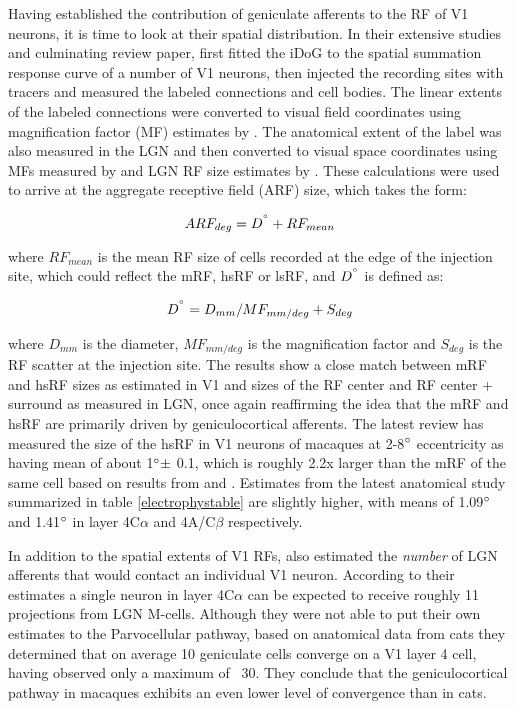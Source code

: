 Having established the contribution of geniculate afferents to the RF
of V1 neurons, it is time to look at their spatial distribution. In their
extensive studies and culminating review paper, \cite{Angelucci2006}
first fitted the iDoG to the spatial summation response curve of a
number of V1 neurons, then injected the recording sites with tracers and
measured the labeled connections and cell bodies. The linear
extents of the labeled connections were converted to visual field
coordinates using magnification factor (MF) estimates by
\cite{VanEssen1984}. The anatomical extent of the label was also
measured in the LGN and then converted to visual space coordinates using
MFs measured by \cite{Connolly1984} and LGN RF size estimates by
\cite{Derrington1984}. These calculations were used to arrive at the
aggregate receptive field (ARF) size, which takes the form:

\begin{equation}
  ARF_{deg} = D^{\degree} + RF_{mean}
\end{equation}

where $RF_{mean}$ is the mean RF size of cells recorded at the edge of
the injection site, which could reflect the mRF, hsRF or lsRF, and
$D^{\degree}$ is defined as:

\begin{equation}
  D^{\degree} = D_{mm} / MF_{mm/deg} + S_{deg}
\end{equation}

where $D_{mm}$ is the diameter, $MF_{mm/deg}$ is the magnification
factor and $S_{deg}$ is the RF scatter at the injection site. The
results show a close match between mRF and hsRF sizes as estimated in
V1 and sizes of the RF center and RF center + surround as measured in
LGN, once again reaffirming the idea that the mRF and hsRF are
primarily driven by geniculocortical afferents. The latest review
\citep{Angelucci2006} has measured the size of the hsRF in V1 neurons
of macaques at 2-8$\degree$ eccentricity as having mean of about
1$\degree \pm$ 0.1, which is roughly 2.2x larger than the mRF of the
same cell based on results from \cite{Angelucci2002} and
\cite{Levitt2002}. Estimates from the latest anatomical study
summarized in table \ref{electrophystable} are slightly higher,
with means of 1.09$\degree$ and 1.41$\degree$ in layer
4C$\alpha$ and 4A/C$\beta$ respectively.

In addition to the spatial extents of V1 RFs, \cite{Angelucci2006a}
also estimated the \emph{number} of LGN afferents that would contact an
individual V1 neuron. According to their estimates a single neuron in
layer 4C$\alpha$ can be expected to receive roughly 11 projections
from LGN M-cells. Although they were not able to put their own
estimates to the Parvocellular pathway, based on anatomical data from
cats they determined that on average 10 geniculate cells converge on a
V1 layer 4 cell, having observed only a maximum of ~30. They conclude
that the geniculocortical pathway in macaques exhibits an even lower
level of convergence than in cats.


